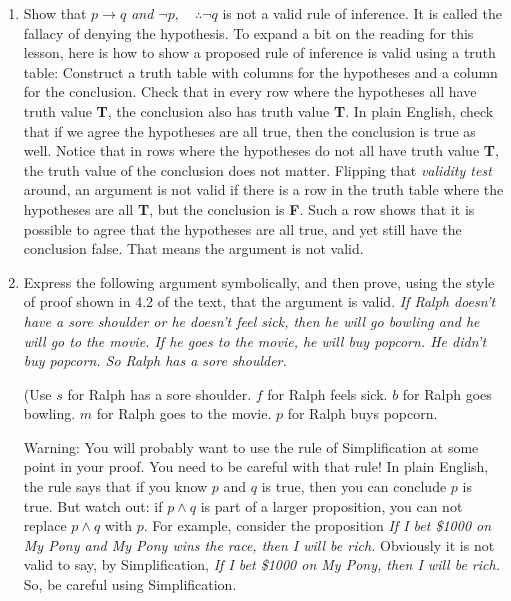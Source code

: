\documentclass[11pt]{amsart}
\begin{document}
\begin{enumerate}
\begin{enumerate}
\end{enumerate}

\item  Show that {\it $p\longrightarrow q$ and $\neg p,\quad \therefore \neg q$} is not a valid rule
of inference. It is called the fallacy of denying the hypothesis. To expand a bit on the reading for this lesson, here is how to show a proposed rule of inference is valid using a truth table: Construct a truth table with columns for the hypotheses and a column for the conclusion. Check that in every row where the hypotheses all have truth value {\bf T}, the conclusion also has truth value {\bf T}. In plain English, check that if we agree the hypotheses are all true, then the conclusion is true as well. Notice that in rows where the hypotheses do not all have truth value {\bf T}, the truth value of the conclusion does not matter. Flipping that {\it validity test}  around, an argument is not valid if there is a row in the truth table where the hypotheses are all {\bf T}, but the conclusion is {\bf F}. Such a row shows that it is possible to agree that the hypotheses are all true, and yet still have the conclusion false. That means the argument is not valid.\\[5pt]


\item Express the following argument symbolically, and then prove, using the style of proof shown in  4.2 of the text,  that the argument is valid.  {\it If Ralph doesn't have a sore shoulder
or he doesn't feel sick, then he will go bowling and  he will go to the movie. If he goes to the movie, he will buy popcorn.  He didn't buy popcorn. So Ralph has a sore shoulder.}

(Use
$s$ for Ralph has a sore shoulder.
$f$ for Ralph feels sick. 
$b$ for Ralph goes bowling.
$m$ for Ralph goes to the movie.
$p$ for Ralph buys popcorn.

Warning: You will probably want to use the rule of Simplification at some point in your proof. You need to be careful with that rule! In plain English, the rule says that if you know $p$ and $q$ is true, then you can conclude $p$ is true. But watch out: if $p \land q$ is part of a larger proposition, you can not replace $p \land q$ with $p$. For example, consider the proposition {\it If I bet \$1000 on My Pony and My Pony wins the race, then I will be rich.} Obviously it is not valid to say, by Simplification, {\it If I bet \$1000 on My Pony, then I will be rich.} So, be careful using Simplification.\\[5pt]



\end{enumerate}
\end{document}
